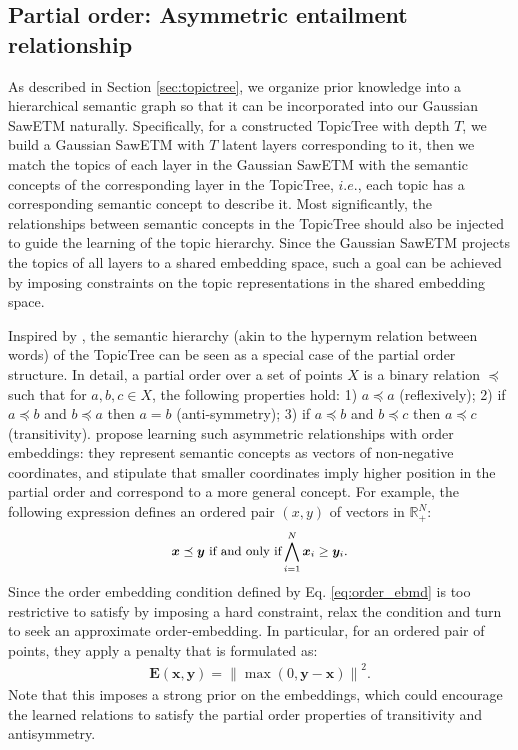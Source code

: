 \documentclass{article}
\newcommand{\xv}[0]{\ensuremath{\boldsymbol{x}} }
\newcommand{\yv}[0]{\ensuremath{\boldsymbol{y}} }
\newcommand{\Ev}[0]{\ensuremath{\boldsymbol{E}} }
\begin{document}
\subsection{Partial order: Asymmetric entailment relationship} 
As described in Section \ref{sec:topictree}, 
we organize prior knowledge into a hierarchical semantic graph so that it can be incorporated into our Gaussian SawETM naturally. Specifically, for a constructed TopicTree with depth $T$, we build a Gaussian SawETM with $T$ latent layers corresponding to it, then we match the topics of each layer in the Gaussian SawETM with the semantic concepts of the corresponding layer in the TopicTree, $i.e.$, each topic has a corresponding semantic concept to describe it. Most significantly, the relationships between semantic concepts in the TopicTree should also be injected
to guide the learning of the topic hierarchy. Since the Gaussian SawETM projects the topics of all layers to a shared embedding space, such a goal can be achieved by imposing constraints on the topic representations in the shared embedding space.
 
Inspired by \citet{vendrov2015order}, the semantic hierarchy (akin to the hypernym relation between words) of the TopicTree can be seen as a special case of the partial order structure. In detail, a partial order over a set of points $X$ is a binary relation $\preceq$ such that for $a,b,c \in X$, the following properties hold: 1) $a \preceq a$ (reflexively); 2) if $a \preceq b$ and $b \preceq a $ then $a=b$ (anti-symmetry); 3) if $a \preceq b$ and $b \preceq c$ then $a \preceq c$ (transitivity). %
\citet{vendrov2015order} propose learning such asymmetric relationships with order embeddings:  they represent semantic concepts as vectors of non-negative coordinates, and stipulate that smaller coordinates imply higher position in the partial order and correspond to a more general concept. For example, the following expression defines an ordered pair $(x,y)$ of vectors in $\mathbb{R}_+ ^N$:
\begin{equation}\label{eq:order_ebmd}
\small
\begin{split}
\xv \preceq \yv \text{ if and only if} \bigwedge_{i = 1}^N \xv_i \geq \yv_i . 
\end{split}
\end{equation}
Since the order embedding condition defined by Eq. \eqref{eq:order_ebmd} is too restrictive to satisfy by imposing a hard constraint, \citet{vendrov2015order} relax the condition and turn to seek an approximate order-embedding. In particular, for an ordered pair of points, they apply a penalty that is formulated as:
\begin{align}\label{eq:order_penalty}
\Ev(\xv,\yv) = {\|\max (0,\yv-\xv)\|}^2.
\end{align}
Note that this imposes a strong prior on the embeddings, which could encourage the learned relations to satisfy the partial order properties of transitivity and antisymmetry.
\end{document}
